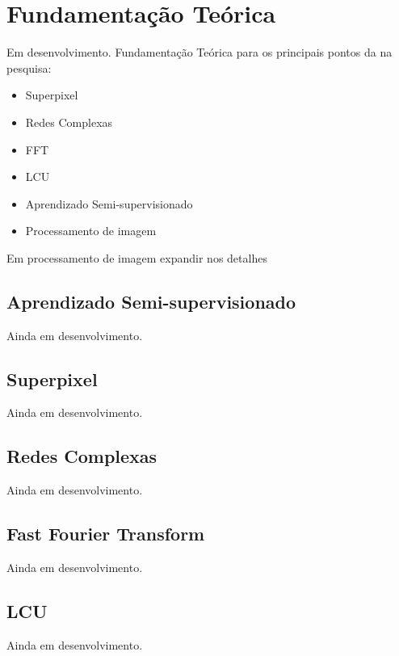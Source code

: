 \chapter{Fundamentação Teórica}
\label{cap:fundamentacao-teorica}

Em desenvolvimento. Fundamentação Teórica para os principais pontos da
na pesquisa:

\begin{itemize}
\item Superpixel
\item Redes Complexas
\item \gls{FFT}
\item \gls{LCU}
\item Aprendizado Semi-supervisionado
\item Processamento de imagem
\end{itemize}

Em processamento de imagem expandir nos detalhes


\section{Aprendizado Semi-supervisionado}
\label{sec:teorica-aprendizado-semi-supervisionado}

Ainda em desenvolvimento.

\section{Superpixel}
\label{sec:teorica-superpixel}

Ainda em desenvolvimento.

\section{Redes Complexas}
\label{sec:teorica-redes-complexas}

Ainda em desenvolvimento.

\section{Fast Fourier Transform}
\label{sec:teorica-fast-fourier-transform}

Ainda em desenvolvimento.

\section{LCU}
\label{sec:teorica-lcu}

Ainda em desenvolvimento.

